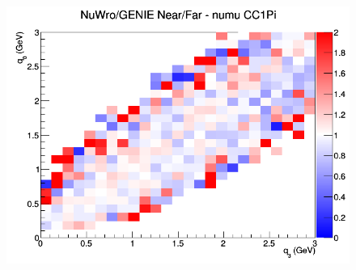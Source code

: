 \begin{figure}[h]
\endminipage
{}
\includegraphics[width=\linewidth]{eff_q0_q3/GAr/ratios/CC1Pi_NuWro_GENIE_numu_NF_q3_q0.png}
\endminipage
\newline
\end{figure}
\clearpage
